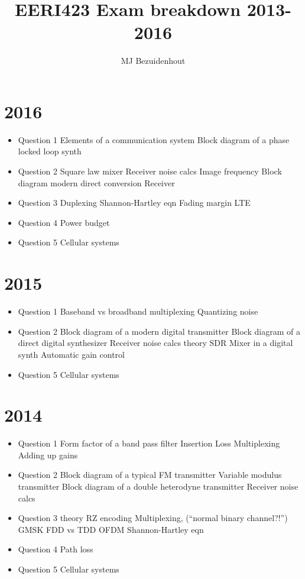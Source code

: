 \documentclass{article}
\author{MJ Bezuidenhout}
\title{EERI423 Exam breakdown 2013-2016}
\begin{document}
\begin{multicols}{2}
\maketitle
\section{2016}
\begin{itemize}
	\item Question 1
		\subitem Elements of a communication system 
		\subitem Block diagram of a phase locked loop synth
	\item Question 2
		\subitem Square law mixer
		\subitem Receiver noise calcs
		\subitem Image frequency
		\subitem Block diagram modern direct conversion Receiver
	\item Question 3
		\subitem Duplexing
		\subitem Shannon-Hartley eqn
		\subitem Fading margin
		\subitem LTE
	\item Question 4
		\subitem Power budget
	\item Question 5
		\subitem Cellular systems
	
\end{itemize}
\section{2015}
\begin{itemize}
	\item Question 1
		\subitem Baseband vs broadband
		\subitem multiplexing
		\subitem Quantizing noise
	\item Question 2
		\subitem Block diagram of a modern digital transmitter
		\subitem Block diagram of a direct digital synthesizer
		\subitem Receiver noise calcs
		\subitem theory
			\subsubitem SDR	
			\subsubitem Mixer in a digital synth	
			\subsubitem Automatic gain control	
	\item Question 5
		\subitem Cellular systems
	
\end{itemize}

\section{2014}
\begin{itemize}
	\item Question 1
		\subitem Form factor of a band pass filter
		\subitem Insertion Loss
		\subitem Multiplexing
		\subitem Adding up gains
	\item Question 2
		\subitem Block diagram of a typical FM transmitter
		\subitem Variable modulus transmitter
		\subitem Block diagram of a double heterodyne transmitter
		\subitem Receiver noise calcs
	\item Question 3
		\subitem theory
			\subsubitem RZ encoding
			\subsubitem Multiplexing, (``normal binary channel?!'')
			\subsubitem GMSK
			\subsubitem FDD vs TDD
			\subsubitem OFDM
		\subitem Shannon-Hartley eqn
	\item Question 4
		\subitem Path loss
	\item Question 5
		\subitem Cellular systems
	

\end{itemize}
\end{multicols}
\end{document}
